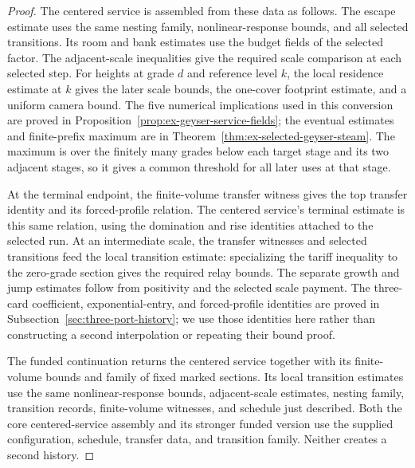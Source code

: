 \begin{proof}
The centered service is assembled from these data as follows. The escape
estimate uses the same nesting family, nonlinear-response bounds, and all
selected transitions. Its room and bank estimates use the budget fields of
the selected factor. The adjacent-scale inequalities give the required
scale comparison at each selected step. For heights at grade $d$ and
reference level $k$, the local residence estimate at $k$ gives the later
scale bounds, the one-cover footprint estimate, and a uniform camera
bound. The five numerical implications used in this conversion are proved
in Proposition~\ref{prop:ex-geyser-service-fields}; the eventual estimates
and finite-prefix maximum are in
Theorem~\ref{thm:ex-selected-geyser-steam}. The maximum is over the finitely
many grades below each target stage and its two adjacent stages, so it gives
a common threshold for all later uses at that stage.

At the terminal endpoint, the finite-volume transfer witness gives the top
transfer identity and its forced-profile relation. The centered service's
terminal estimate is this same relation, using the domination and rise
identities attached to the selected run. At an intermediate scale, the
transfer witnesses and selected transitions feed the local transition
estimate: specializing the tariff inequality to the zero-grade section
gives the required relay bounds. The separate growth and jump estimates
follow from positivity and the selected scale payment. The three-card
coefficient, exponential-entry, and forced-profile identities are proved
in Subsection~\ref{sec:three-port-history}; we use those identities here
rather than constructing a second interpolation or repeating their bound
proof.

The funded continuation returns the centered service together with its
finite-volume bounds and family of fixed marked sections. Its local transition estimates
use the same nonlinear-response bounds, adjacent-scale estimates, nesting
family, transition records, finite-volume witnesses, and schedule just
described. Both the core centered-service assembly and its stronger funded version
use the supplied configuration, schedule, transfer data, and transition
family. Neither creates a second history.


\end{proof}
